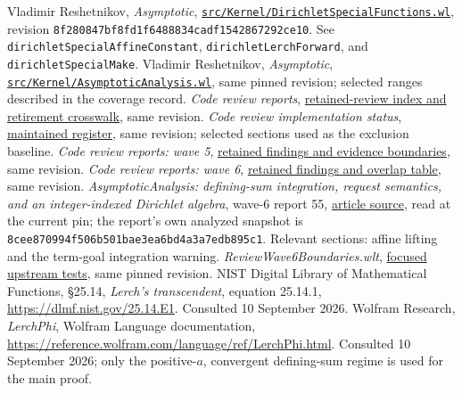 \documentclass[11pt,letterpaper]{article}
\newcommand{\code}[1]{\nolinkurl{#1}}
\newcommand{\pin}{8f280847bf8fd1f6488834cadf1542867292ce10}
\newcommand{\upstream}[2]{\href{https://github.com/VladimirReshetnikov/Asymptotic/blob/8f280847bf8fd1f6488834cadf1542867292ce10/#1}{#2}}
\begin{document}
\begin{thebibliography}{99}
 Vladimir Reshetnikov, \emph{Asymptotic},
\upstream{src/Kernel/DirichletSpecialFunctions.wl}{\code{src/Kernel/DirichletSpecialFunctions.wl}},
revision \texttt{\pin}. See \code{dirichletSpecialAffineConstant},
\code{dirichletLerchForward}, and \code{dirichletSpecialMake}.
 Vladimir Reshetnikov, \emph{Asymptotic},
\upstream{src/Kernel/AsymptoticAnalysis.wl}{\code{src/Kernel/AsymptoticAnalysis.wl}},
same pinned revision; selected ranges described in the coverage record.
 \emph{Code review reports},
\upstream{external-reports/code-review/README.md}{retained-review index and retirement crosswalk}, same revision.
 \emph{Code review implementation status},
\upstream{docs/development/CODE_REVIEW_STATUS.md}{maintained register}, same revision; selected sections used as the exclusion baseline.
 \emph{Code review reports: wave 5},
\upstream{external-reports/code-review/wave-5/README.md}{retained findings and evidence boundaries}, same revision.
 \emph{Code review reports: wave 6},
\upstream{external-reports/code-review/wave-6/README.md}{retained findings and overlap table}, same revision.
 \emph{AsymptoticAnalysis: defining-sum integration, request semantics,
and an integer-indexed Dirichlet algebra}, wave-6 report 55,
\upstream{external-reports/code-review/wave-6/code-review-55/article/review.tex}{article source},
read at the current pin; the report's own analyzed snapshot is
\texttt{8cee870994f506b501bae3ea6bd4a3a7edb895c1}. Relevant sections: affine lifting
and the term-goal integration warning.
 \emph{ReviewWave6Boundaries.wlt},
\upstream{src/Tests/ReviewWave6Boundaries.wlt}{focused upstream tests}, same pinned revision.
 NIST Digital Library of Mathematical Functions, \S25.14,
\emph{Lerch's transcendent}, equation 25.14.1,
\url{https://dlmf.nist.gov/25.14.E1}. Consulted 10 September 2026.
 Wolfram Research, \emph{LerchPhi}, Wolfram Language documentation,
\url{https://reference.wolfram.com/language/ref/LerchPhi.html}.
Consulted 10 September 2026; only the positive-$a$, convergent defining-sum regime
is used for the main proof.
\end{thebibliography}
\end{document}
